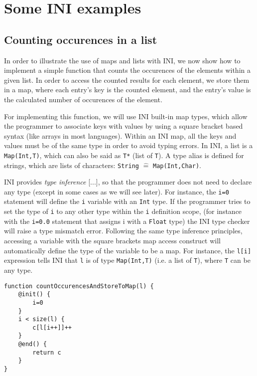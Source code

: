 \documentclass[11pt]{article}
\begin{document}
\section{Some INI examples}

\subsection{Counting occurences in a list\label{sec:counting_occurences_in_a_list}}

In order to illustrate the use of maps and lists with INI, we now show how to implement a simple function that counts the occurences of the elements within a given list. In order to access the counted results for each element, we store them in a map, where each entry's key is the counted element, and the entry's value is the calculated number of occurences of the element.

For implementing this function, we will use INI built-in map types, which allow the programmer to associate keys with values by using a square bracket based syntax (like arrays in most languages). Within an INI map, all the keys and values must be of the same type in order to avoid typing errors. In INI, a list is a \texttt{Map(Int,T)}, which can also be said as \texttt{T*} (list of \texttt{T}). A type alias is defined for strings, which are lists of characters: \texttt{String} $\widehat=$ \texttt{Map(Int,Char)}.

INI provides \emph{type inference} [...], so that the programmer does not need to declare any type (except in some cases as we will see later). For instance, the \texttt{i=0} statement will define the \texttt{i} variable with an \texttt{Int} type. If the programmer tries to set the type of \texttt{i} to any other type within the \texttt{i} definition scope, (for instance with the \texttt{i=0.0} statement that assigns i with a \texttt{Float} type) the INI type checker will raise a type mismatch error. Following the same type inference principles, accessing a variable with the square brackets map access construct will automatically define the type of the variable to be a map. For instance, the \texttt{l[i]} expression tells INI that \texttt{l} is of type \texttt{Map(Int,T)} (i.e. a list of \texttt{T}), where \texttt{T} can be any type.

\begin{lstlisting}
function countOccurencesAndStoreToMap(l) {
	@init() {
		i=0
	}
	i < size(l) {
		c[l[i++]]++
	}
	@end() {
		return c
	}
}
\end{lstlisting}
\end{document}
